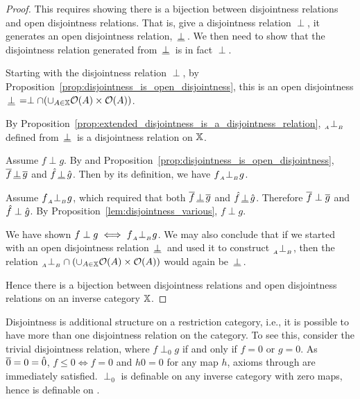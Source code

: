 \begin{proof}
  This requires showing there is a bijection between disjointness relations and open disjointness
  relations. That is, give a disjointness relation $\perp$, it generates an open disjointness
  relation, $\,\underline{\perp}\,$. We then need to show that the disjointness relation generated from
  $\,\underline{\perp}\,$ is in fact $\perp$.

  Starting with the disjointness relation $\perp$, by
  Proposition~\ref{prop:disjointness_is_open_disjointness}, this is an open disjointness $\,\underline{\perp}\, =
  \perp \cap (\cup_{A\in\mathbb{X}}\mathcal{O}({A})\times\mathcal{O}({A}))$.

  By Proposition~\ref{prop:extended_disjointness_is_a_disjointness_relation}, ${}_{{}_{A}}{\perp_{{}_{B}}}$ defined from
  $\,\underline{\perp}\,$ is a disjointness relation on $\mathbb{X}$.

  Assume $f\perp g$. By  and Proposition~\ref{prop:disjointness_is_open_disjointness},
  $\overline{f}\,\underline{\perp}\,\overline{g}$ and $\hat{f}\,\underline{\perp}\,\hat{g}$. Then by its definition, we have $f {}_{{}_{A}}{\perp_{{}_{B}}} g$.

  Assume $f {}_{{}_{A}}{\perp_{{}_{B}}} g$, which required that both $\overline{f}\,\underline{\perp}\,\overline{g}$ and
  $\hat{f}\,\underline{\perp}\,\hat{g}$. Therefore $\overline{f}\perp\overline{g}$ and  $\hat{f}\perp\hat{g}$. By
  Proposition~\ref{lem:disjointness_various}, $f \perp g$.

  We have shown $f \perp g \iff f{}_{{}_{A}}{\perp_{{}_{B}}} g$. We may also conclude that if we started with an open
  disjointness relation $\,\underline{\perp}\,$ and used it to construct ${}_{{}_{A}}{\perp_{{}_{B}}}$, then the relation ${}_{{}_{A}}{\perp_{{}_{B}}}
  \cap (\cup_{A\in\mathbb{X}}\mathcal{O}({A})\times\mathcal{O}({A}))$ would again be $\,\underline{\perp}\,$.

  Hence there is a bijection between disjointness relations and open disjointness relations on
  an inverse category $\mathbb{X}$.
\end{proof}


Disjointness is additional structure on a restriction category, i.e., it is possible to have more
than one disjointness relation on the category. To see this, consider the trivial disjointness
relation, where $f \perp_0 g$ if and only if $f = 0$ or $g = 0$. As $\overline{0} = 0 = \hat{0}$, $f \le 0
\iff f = 0$ and $h 0 =0$ for any map $h$, axioms  through  are
immediately satisfied. $\perp_0$ is definable on any inverse category with zero maps, hence is
definable on \pinj.

